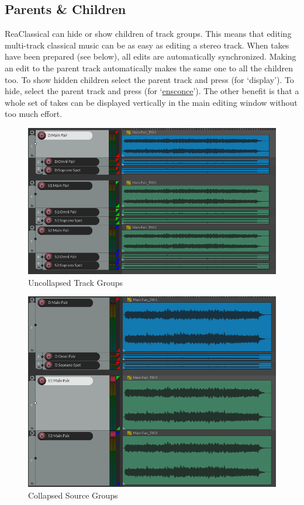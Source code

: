 \documentclass[10pt,american]{article}
\begin{document}
\subsection{Parents \& Children}

ReaClassical can hide or show children of track groups. This means that editing
multi-track classical music can be as easy as editing a stereo track. When takes
have been prepared (see below), all edits are automatically synchronized. Making
an edit to the parent track automatically makes the same one to all the children
too. To show hidden children select the parent track and press  (for
`display'). To hide, select the parent track and press  (for
`\href{https://www.merriam-webster.com/dictionary/ensconce}{ensconce}'). The
other benefit is that a whole set of takes can be displayed vertically in the
main editing window without too much effort. 

\begin{figure}
\includegraphics[width=1\linewidth]{user_guide_images/uncollapsed}

\caption{Uncollapsed Track Groups}

\end{figure}

\begin{figure}
\includegraphics[width=1\linewidth]{user_guide_images/collapsed}

\caption{Collapsed Source Groups}

\end{figure}
\end{document}
